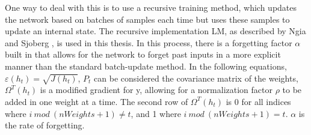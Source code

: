 	\par One way to deal with this is to use a recursive training method, which updates the network based on batches of samples each time but uses these samples to update an internal state. The recursive implementation LM, as described by Ngia and Sjoberg \cite{ngia1998adaptive}, is used in this thesis. In this process, there is a forgetting factor $\alpha$ built in that allows for the network to forget past inputs in a more explicit manner than the standard batch-update method. In the following equations, $\varepsilon(h_t) = \sqrt{J(h_t)}$, $P_t$ can be considered the covariance matrix of the weights, $\Omega^T(h_t)$ is a modified gradient for y, allowing for a normalization factor $\rho$ to be added in one weight at a time. The second row of $\Omega^T(h_t)$ is 0 for all indices where $i\ mod\ (nWeights+1) \neq t$, and 1 where $i\ mod\ (nWeights+1) = t$. $\alpha$ is the rate of forgetting. 
	
